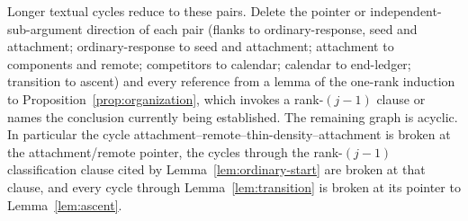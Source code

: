 Longer textual cycles reduce to these pairs. Delete the pointer or independent-sub-argument direction of each pair (flanks to ordinary-response, seed and attachment; ordinary-response to seed and attachment; attachment to components and remote; competitors to calendar; calendar to end-ledger; transition to ascent) and every reference from a lemma of the one-rank induction to Proposition~\ref{prop:organization}, which invokes a rank-\((j-1)\) clause or names the conclusion currently being established. The remaining graph is acyclic. In particular the cycle attachment--remote--thin-density--attachment is broken at the attachment/remote pointer, the cycles through the rank-\((j-1)\) classification clause cited by Lemma~\ref{lem:ordinary-start} are broken at that clause, and every cycle through Lemma~\ref{lem:transition} is broken at its pointer to Lemma~\ref{lem:ascent}.

